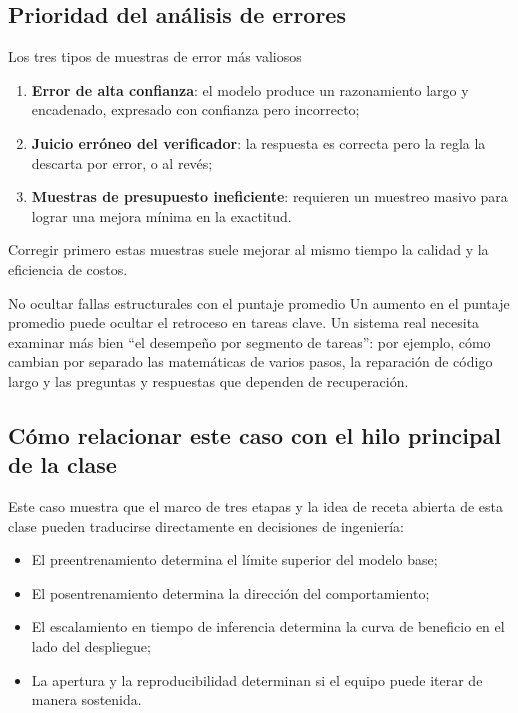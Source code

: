 \documentclass[a4paper]{article}
\begin{document}
\subsection{Prioridad del análisis de errores}
\begin{knowledgebox}{Los tres tipos de muestras de error más valiosos}
\begin{enumerate}
    \item \textbf{Error de alta confianza}: el modelo produce un razonamiento largo y encadenado, expresado con confianza pero incorrecto;
    \item \textbf{Juicio erróneo del verificador}: la respuesta es correcta pero la regla la descarta por error, o al revés;
    \item \textbf{Muestras de presupuesto ineficiente}: requieren un muestreo masivo para lograr una mejora mínima en la exactitud.
\end{enumerate}
Corregir primero estas muestras suele mejorar al mismo tiempo la calidad y la eficiencia de costos.
\end{knowledgebox}

\begin{warningbox}{No ocultar fallas estructurales con el puntaje promedio}
Un aumento en el puntaje promedio puede ocultar el retroceso en tareas clave. Un sistema real necesita examinar más bien ``el desempeño por segmento de tareas'': por ejemplo, cómo cambian por separado las matemáticas de varios pasos, la reparación de código largo y las preguntas y respuestas que dependen de recuperación.
\end{warningbox}

\subsection{Cómo relacionar este caso con el hilo principal de la clase}
Este caso muestra que el marco de tres etapas y la idea de receta abierta de esta clase pueden traducirse directamente en decisiones de ingeniería:
\begin{itemize}
    \item El preentrenamiento determina el límite superior del modelo base;
    \item El posentrenamiento determina la dirección del comportamiento;
    \item El escalamiento en tiempo de inferencia determina la curva de beneficio en el lado del despliegue;
    \item La apertura y la reproducibilidad determinan si el equipo puede iterar de manera sostenida.
\end{itemize}
\end{document}

